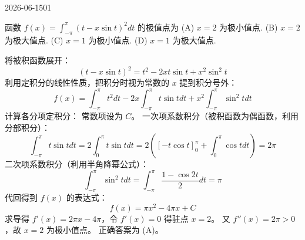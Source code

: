 \begin{mistake}{2026-06-15}{01}

\begin{problemcontent}
函数 \(f(x) = \int_{-\pi}^{\pi} (t - x\sin t)^2 dt\) 的极值点为
(A) \(x = 2\) 为极小值点.
(B) \(x = 2\) 为极大值点.
(C) \(x = 1\) 为极小值点.
(D) \(x = 1\) 为极大值点.
\end{problemcontent}

\begin{solutioncontent}
将被积函数展开：
\[ (t - x\sin t)^2 = t^2 - 2xt\sin t + x^2\sin^2 t \]
利用定积分的线性性质，把积分时视为常数的 \(x\) 提到积分号外：
\[ f(x) = \int_{-\pi}^{\pi} t^2 dt - 2x \int_{-\pi}^{\pi} t\sin t dt + x^2 \int_{-\pi}^{\pi} \sin^2 t dt \]
计算各分项定积分：
常数项设为 \(C\)。
一次项系数积分（被积函数为偶函数，利用分部积分）：
\[ \int_{-\pi}^{\pi} t\sin t dt = 2 \int_{0}^{\pi} t\sin t dt = 2\left( [-t\cos t]_0^\pi + \int_{0}^{\pi} \cos t dt \right) = 2\pi \]
二次项系数积分（利用半角降幂公式）：
\[ \int_{-\pi}^{\pi} \sin^2 t dt = \int_{-\pi}^{\pi} \frac{1-\cos 2t}{2} dt = \pi \]
代回得到 \(f(x)\) 的表达式：
\[ f(x) = \pi x^2 - 4\pi x + C \]
求导得 \(f'(x) = 2\pi x - 4\pi\)，令 \(f'(x) = 0\) 得驻点 \(x = 2\)。
又 \(f''(x) = 2\pi > 0\)，故 \(x = 2\) 为极小值点。
正确答案为 (A)。
\end{solutioncontent}


\end{mistake}
